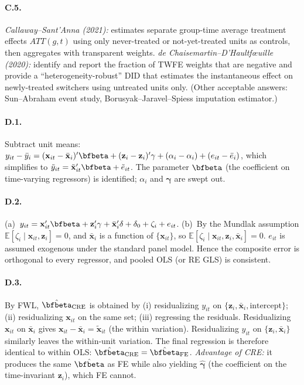 \documentclass{article}
\newcommand{\E}{\mathbb{E}}
\begin{document}
\paragraph{C.5.}  \emph{Callaway--Sant'Anna (2021):} estimates separate group-time average treatment effects $ATT(g, t)$ using only never-treated or not-yet-treated units as controls, then aggregates with transparent weights.  \emph{de Chaisemartin--D'Haultf\oe{}uille (2020):} identify and report the fraction of TWFE weights that are negative and provide a ``heterogeneity-robust'' DID that estimates the instantaneous effect on newly-treated switchers using untreated units only.  (Other acceptable answers: Sun--Abraham event study, Borusyak--Jaravel--Spiess imputation estimator.)

\bigskip

\paragraph{D.1.}  Subtract unit means: $y_{it} - \bar y_i = (\bm x_{it} - \bar{\bm x}_i)'\bfbeta + (\bm z_i - \bm z_i)'\bm\gamma + (\alpha_i - \alpha_i) + (e_{it} - \bar e_i)$, which simplifies to $\tilde y_{it} = \tilde{\bm x}_{it}'\bfbeta + \tilde e_{it}$.  The parameter $\bfbeta$ (the coefficient on time-varying regressors) is identified; $\alpha_i$ and $\bm\gamma$ are swept out.

\paragraph{D.2.}  (a)~$y_{it} = \bm x_{it}'\bfbeta + \bm z_i'\bm\gamma + \bar{\bm x}_i'\bm\delta + \delta_0 + \zeta_i + e_{it}$.  (b)~By the Mundlak assumption $\E[\zeta_i\mid \bm x_{it}, \bm z_i] = 0$, and $\bar{\bm x}_i$ is a function of $\{\bm x_{it}\}$, so $\E[\zeta_i\mid \bm x_{it}, \bm z_i, \bar{\bm x}_i] = 0$.  $e_{it}$ is assumed exogenous under the standard panel model.  Hence the composite error is orthogonal to every regressor, and pooled OLS (or RE GLS) is consistent.

\paragraph{D.3.}  By FWL, $\hat\bfbeta_{\text{CRE}}$ is obtained by (i) residualizing $y_{it}$ on $\{\bm z_i, \bar{\bm x}_i, \text{intercept}\}$; (ii) residualizing $\bm x_{it}$ on the same set; (iii) regressing the residuals.  Residualizing $\bm x_{it}$ on $\bar{\bm x}_i$ gives $\bm x_{it} - \bar{\bm x}_i = \tilde{\bm x}_{it}$ (the within variation).  Residualizing $y_{it}$ on $\{\bm z_i, \bar{\bm x}_i\}$ similarly leaves the within-unit variation.  The final regression is therefore identical to within OLS: $\hat\bfbeta_{\text{CRE}} = \hat\bfbeta_{\text{FE}}$.  \emph{Advantage of CRE:} it produces the same $\hat\bfbeta$ as FE while also yielding $\hat{\bm\gamma}$ (the coefficient on the time-invariant $\bm z_i$), which FE cannot.
\end{document}
